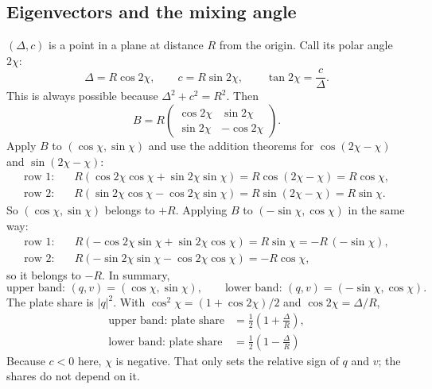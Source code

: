 \subsection{Eigenvectors and the mixing angle}
$(\Delta, c)$ is a point in a plane at distance $R$ from the origin. Call its polar
angle $2\chi$:
\begin{equation}
  \Delta = R\cos 2\chi, \qquad c = R\sin 2\chi, \qquad \tan 2\chi = \frac{c}{\Delta} .
\end{equation}
This is always possible because $\Delta^2 + c^2 = R^2$. Then
\begin{equation}
  B = R \begin{pmatrix} \cos 2\chi & \sin 2\chi \\ \sin 2\chi & -\cos 2\chi \end{pmatrix} .
\end{equation}
Apply $B$ to $(\cos\chi, \sin\chi)$ and use the addition theorems for
$\cos(2\chi - \chi)$ and $\sin(2\chi - \chi)$:
\begin{align}
  \text{row 1:} \quad & R(\cos 2\chi\cos\chi + \sin 2\chi\sin\chi) = R\cos(2\chi - \chi) = R\cos\chi, \\
  \text{row 2:} \quad & R(\sin 2\chi\cos\chi - \cos 2\chi\sin\chi) = R\sin(2\chi - \chi) = R\sin\chi .
\end{align}
So $(\cos\chi, \sin\chi)$ belongs to $+R$. Applying $B$ to $(-\sin\chi, \cos\chi)$
in the same way:
\begin{align}
  \text{row 1:} \quad & R(-\cos 2\chi\sin\chi + \sin 2\chi\cos\chi) = R\sin\chi = -R\,(-\sin\chi), \\
  \text{row 2:} \quad & R(-\sin 2\chi\sin\chi - \cos 2\chi\cos\chi) = -R\cos\chi ,
\end{align}
so it belongs to $-R$. In summary,
\begin{equation}
  \text{upper band: } (q, v) = (\cos\chi, \sin\chi), \qquad
  \text{lower band: } (q, v) = (-\sin\chi, \cos\chi) .
\end{equation}
The plate share is $|q|^2$. With $\cos^2\chi = (1 + \cos 2\chi)/2$ and
$\cos 2\chi = \Delta/R$,
\begin{equation}
  \boxed{\;\begin{aligned}
  \text{upper band: plate share} &= \tfrac12\left(1 + \frac{\Delta}{R}\right), \\
  \text{lower band: plate share} &= \tfrac12\left(1 - \frac{\Delta}{R}\right)
  \end{aligned}\;}
\end{equation}
Because $c < 0$ here, $\chi$ is negative. That only sets the relative sign of $q$ and
$v$; the shares do not depend on it.

